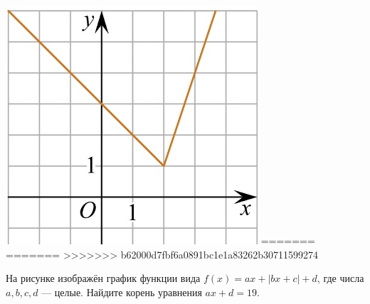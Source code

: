 \begin{class}[number=5]
\begin{listofex}
\begin{minipage}[t]{\bodywidth}
\begin{minipage}[t]{\bodywidth}
\begin{minipage}[t]{\bodywidth}
\begin{minipage}[t]{\bodywidth}
\begin{minipage}[t]{0.43\textwidth}
\begin{minipage}[t]{\bodywidth}
\begin{minipage}[t]{0.43\textwidth}
\begin{minipage}[t]{\bodywidth}
\begin{minipage}[t]{0.43\textwidth}
\begin{minipage}[t]{\bodywidth}
\begin{minipage}[t]{0.43\textwidth}
\begin{minipage}[t]{\bodywidth}
\begin{minipage}[t]{\bodywidth}
\begin{minipage}[t]{\bodywidth}
\begin{minipage}[t]{0.43\textwidth}
\begin{minipage}[t]{0.43\textwidth}
\begin{minipage}[t]{\bodywidth}
\begin{minipage}[t]{0.43\textwidth}
\begin{minipage}[t]{\bodywidth}
\begin{minipage}[t]{0.43\textwidth}
		\hspace{0.05\linewidth}
		\begin{minipage}[t]{\picwidth}
			\includegraphics[align=t, width=\linewidth]{../pics/G101M4C5-7.jpg}
=======
=======
>>>>>>> b62000d7fbf6a0891bc1e1a83262b30711599274
		\begin{minipage}[t]{0.43\textwidth}
			На рисунке изображён график функции вида \(f(x)=ax+|bx+c|+d\), где числа \(a, b, c, d\) --- целые. Найдите корень уравнения \(ax+d=19\).
		\end{minipage}
		\begin{minipage}[c]{0.17\textwidth}

\end{minipage}
\end{minipage}
\end{minipage}
\end{minipage}
\end{minipage}
\end{minipage}
\end{minipage}
\end{minipage}
\end{minipage}
\end{minipage}
\end{minipage}
\end{minipage}
\end{minipage}
\end{minipage}
\end{minipage}
\end{minipage}
\end{minipage}
\end{minipage}
\end{minipage}
\end{minipage}
\end{minipage}
\end{minipage}
\end{listofex}
\end{class}
